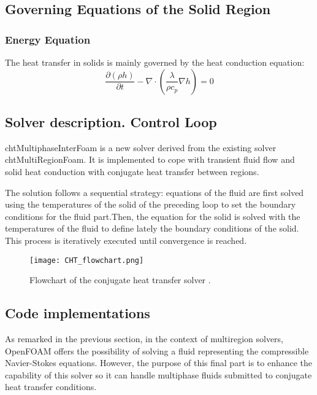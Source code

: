 \subsection{Governing Equations of the Solid Region}
\subsubsection{Energy Equation}

\setlength{\parindent}{0.5cm} The heat transfer in solids is mainly governed by the heat conduction equation:
\begin{equation}
	\frac{\partial (\rho h)}{\partial t} - \nabla \cdot\left(\frac{\lambda}{\rho c_{p}} \nabla h\right)=0
	\label{4.6}
\end{equation}
\clearpage

\subsection{Solver description. Control Loop}
\noindent chtMultiphaseInterFoam is a new solver derived from the existing solver chtMultiRegionFoam. It is implemented to cope with transient fluid flow and solid heat conduction with conjugate heat transfer between regions.

\noindent The solution follows a sequential strategy: equations of the fluid are first solved using the temperatures of the solid of the preceding loop to set the boundary conditions for the fluid part.Then, the equation for the solid is solved with the temperatures of the fluid to define lately the boundary conditions of the solid. This process is iteratively executed until convergence is reached.
\begin{figure}[h!]
	\centering
	\texttt{[image: CHT\_flowchart.png]}	
	\label{4.2fig}
	\caption{Flowchart of the conjugate heat transfer solver \cite{sugimoto_kuramae_matsumoto_watanabe_2021}.}
\end{figure} 
\subsection{Code implementations}

\setlength{\parindent}{0.5cm} As remarked in the previous section, in the context of multiregion solvers, OpenFOAM offers the possibility of solving a fluid representing the compressible Navier-Stokes equations. However, the purpose of this final part is to enhance the capability of this solver so it can handle multiphase fluids submitted to conjugate heat transfer conditions.

